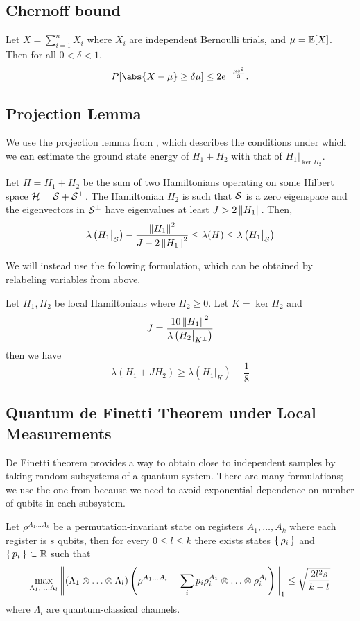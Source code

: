 \subsection{Chernoff bound}

\begin{thm}
\label{thm:Chernoff}
Let $X=\sum_{i=1}^n X_i$ where $X_i$ are independent Bernoulli trials, and $\mu=\operatorname*{\mathbb{E}}[X]$.
Then for all $0<\delta<1$,
$$P[\abs{X-\mu}\geq\delta\mu]\leq2e^{-\frac{\mu\delta^2}{3}}.$$
\end{thm}

\subsection{Projection Lemma}

We use the projection lemma from \cite{kempe_kitaev_regev_2006}, which describes the conditions under which we can estimate the ground state energy of $H_1 + H_2$ with that of $H_1\big|_{\ker H_2}$.

\begin{thm}
	Let $H=H_1+H_2$ be the sum of two Hamiltonians operating on some Hilbert space $\mathcal{H}=\mathcal{S}+\mathcal{S}^\bot$.
	The Hamiltonian $H_2$ is such that $\mathcal{S}$ is a zero eigenspace and the eigenvectors in $\mathcal{S}^\bot$ have eigenvalues at least $J>2\left\lVert H_1\right\rVert$. Then,
	$$\lambda\left(H_1\big|_{\mathcal{S}}\right)-\frac{\left\lVert H_1\right\rVert^2}{J-2\left\lVert H_1\right\rVert^2}\leq\lambda(H)\leq\lambda\left(H_1\big|_{\mathcal{S}}\right)$$
\end{thm}

We will instead use the following formulation, which can be obtained by relabeling variables from above.


\begin{thm}
	\label{thm:projection}
	Let $H_1, H_2$ be local Hamiltonians where $H_2\geq0$. Let $K=\ker H_2$ and
	$$J=\frac{10\left\lVert H_1\right\rVert^2}{\lambda\left(H_2\big|_{K^\bot}\right)}$$
	then we have
	$$\lambda(H_1+JH_2)\geq\lambda\left(H_1\big|_K\right)-\frac{1}{8}$$
\end{thm}

\subsection{Quantum de Finetti Theorem under Local Measurements}

De Finetti theorem provides a way to obtain close to independent samples by taking random subsystems of a quantum system.
There are many formulations; we use the one from \cite{Brandão2017} because we need to avoid exponential dependence on number of qubits in each subsystem.
\begin{thm}
	\label{deFinetti}
	Let $\rho^{A_1\ldots A_k}$ be a permutation-invariant state on registers $A_1,\ldots,A_k$ where each register is $s$ qubits,
	then for every $0\leq l\leq k$ there exists states $\set{\rho_i}$ and $\set{p_i}\subset\mathbb{R}$ such that
	$$\max_{\Lambda_1,\ldots,\Lambda_l}
	\left\lVert(\Lambda_1\otimes\ldots\otimes\Lambda_l)\left(\rho^{A_1\ldots A_l}-\sum_ip_i\rho_i^{A_1}\otimes\ldots\otimes\rho_i^{A_l}\right)\right\rVert_1
	\leq\sqrt{\frac{2l^2s}{k-l}}$$
	where $\Lambda_i$ are quantum-classical channels.
\end{thm}

